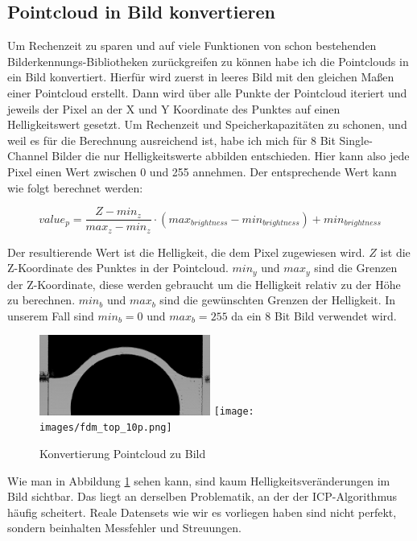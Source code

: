 \documentclass[../main.tex]{subfiles}
\begin{document}
\subsection{Pointcloud in Bild konvertieren}

Um Rechenzeit zu sparen und auf viele Funktionen von schon bestehenden 
Bilderkennungs-Bibliotheken zurückgreifen zu können habe ich die Pointclouds in ein
Bild konvertiert. Hierfür wird zuerst in leeres Bild mit den gleichen Maßen einer 
Pointcloud erstellt. Dann wird über alle Punkte der Pointcloud iteriert und jeweils
der Pixel an der X und Y Koordinate des Punktes auf einen Helligkeitswert gesetzt.
Um Rechenzeit und Speicherkapazitäten zu schonen, und weil es für die Berechnung 
ausreichend ist, habe ich mich für 8 Bit Single-Channel Bilder die nur Helligkeitswerte 
abbilden entschieden. Hier kann also jede Pixel einen Wert zwischen 0 und 255 annehmen.
Der entsprechende Wert kann wie folgt berechnet werden:

\begin{equation*}
    value_p = \frac{Z - min_z}{max_z - min_z} \cdot (max_{brightness} - min_{brightness}) + min_{brightness}
\end{equation*}

Der resultierende Wert ist die Helligkeit, die dem Pixel zugewiesen wird.
$Z$ ist die Z-Koordinate des Punktes in der Pointcloud. $min_y$ und $max_y$ sind 
die Grenzen der Z-Koordinate, diese werden gebraucht um die Helligkeit relativ 
zu der Höhe zu berechnen. $min_b$ und $max_b$ sind die gewünschten Grenzen der 
Helligkeit. In unserem Fall sind $min_b = 0$ und $max_b = 255$ da ein 8 Bit Bild
verwendet wird.

\begin{figure}[h]
    \centering
    \includegraphics[width=0.5\textwidth]{images/fdm_top_100p.png}
    \texttt{[image: images/fdm\_top\_10p.png]}
    \caption{Konvertierung Pointcloud zu Bild}
    \label{fig:image_from_pc}
\end{figure}

Wie man in Abbildung \ref{fig:image_from_pc} sehen kann, sind kaum Helligkeitsveränderungen
im Bild sichtbar. Das liegt an derselben Problematik, an der der ICP-Algorithmus häufig
scheitert. Reale Datensets wie wir es vorliegen haben sind nicht perfekt, sondern
beinhalten Messfehler und Streuungen. 
\end{document}
